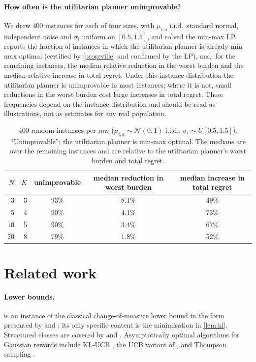 \documentclass[11pt,a4paper]{article}
\theoremstyle{plain}
\theoremstyle{definition}
\theoremstyle{remark}
\begin{document}
\paragraph{How often is the utilitarian planner unimprovable?} We drew 400 instances for each of four sizes, with $\mu_{i,a}$ i.i.d.\ standard normal, independent noise and $\sigma_i$ uniform on $[0.5,1.5]$, and solved the min-max LP.  reports the fraction of instances in which the utilitarian planner is already min-max optimal (certified by \cref{prop:ville} and confirmed by the LP), and, for the remaining instances, the median relative reduction in the worst burden and the median relative increase in total regret. Under this instance distribution the utilitarian planner is unimprovable in most instances; where it is not, small reductions in the worst burden cost large increases in total regret. These frequencies depend on the instance distribution and should be read as illustrations, not as estimates for any real population.

\begin{table}[h]\centering\small
\begin{tabular}{rrccc}
\toprule
$N$ & $K$ & unimprovable & median reduction in worst burden & median increase in total regret\\
\midrule
3 & 3 & 93\% & 8.1\% & 49\%\\
5 & 4 & 90\% & 4.1\% & 73\%\\
10 & 5 & 90\% & 3.4\% & 67\%\\
20 & 8 & 79\% & 1.8\% & 52\%\\
\bottomrule
\end{tabular}
\caption{400 random instances per row ($\mu_{i,a}\sim\mathcal N(0,1)$ i.i.d., $\sigma_i\sim U[0.5,1.5]$). ``Unimprovable'': the utilitarian planner is min-max optimal. The medians are over the remaining instances and are relative to the utilitarian planner's worst burden and total regret.}
\label{tab:freq}
\end{table}

\section{Related work}\label{sec:related}

\paragraph{Lower bounds.}  is an instance of the classical change-of-measure lower bound \citep{lai1985} in the form presented by \citet{lattimore2020} and \citet{garivier2019}; its only specific content is the minimisation in \cref{lem:kl}. Structured classes are covered by \citet{graves1997} and \citet{combes2017}. Asymptotically optimal algorithms for Gaussian rewards include KL-UCB \citep{cappe2013}, the UCB variant of \citet[Ch.~8]{lattimore2020}, and Thompson sampling \citep{korda2013}.
\end{document}
